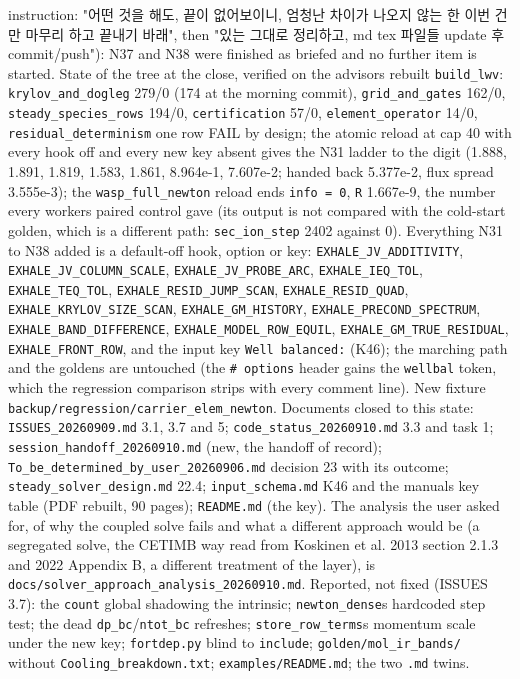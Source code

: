 \documentclass[english,a4paper]{my_memo}
\begin{document}
\begin{itemize}
  instruction: "어떤 것을 해도, 끝이 없어보이니, 엄청난 차이가 나오지 않는 한
  이번 건만 마무리 하고 끝내기 바래", then "있는 그대로 정리하고, md tex
  파일들 update 후 commit/push"): N37 and N38 were finished as briefed and
  no further item is started. State of the tree at the close, verified on
  the advisor\textquotesingle s rebuilt \texttt{build\_lwv}: \texttt{krylov\_and\_dogleg} 279/0 (174 at the
  morning commit), \texttt{grid\_and\_gates} 162/0, \texttt{steady\_species\_rows} 194/0,
  \texttt{certification} 57/0, \texttt{element\_operator} 14/0, \texttt{residual\_determinism} one
  row FAIL by design; the atomic reload at cap 40 with every hook off and
  every new key absent gives the N31 ladder to the digit (1.888, 1.891,
  1.819, 1.583, 1.861, 8.964e-1, 7.607e-2; handed back 5.377e-2, flux
  spread 3.555e-3); the \texttt{wasp\_full\_newton} reload ends \texttt{info\ =\ 0}, \texttt{\textbar{}\textbar{}R\textbar{}\textbar{}}
  1.667e-9, the number every worker\textquotesingle s paired control gave (its output is
  not compared with the cold-start golden, which is a different path:
  \texttt{sec\_ion\_step} 2402 against 0). Everything N31 to N38 added is a
  default-off hook, option or key: \texttt{EXHALE\_JV\_ADDITIVITY},
  \texttt{EXHALE\_JV\_COLUMN\_SCALE}, \texttt{EXHALE\_JV\_PROBE\_ARC}, \texttt{EXHALE\_IEQ\_TOL},
  \texttt{EXHALE\_TEQ\_TOL}, \texttt{EXHALE\_RESID\_JUMP\_SCAN}, \texttt{EXHALE\_RESID\_QUAD},
  \texttt{EXHALE\_KRYLOV\_SIZE\_SCAN}, \texttt{EXHALE\_GM\_HISTORY}, \texttt{EXHALE\_PRECOND\_SPECTRUM},
  \texttt{EXHALE\_BAND\_DIFFERENCE}, \texttt{EXHALE\_MODEL\_ROW\_EQUIL},
  \texttt{EXHALE\_GM\_TRUE\_RESIDUAL}, \texttt{EXHALE\_FRONT\_ROW}, and the input key
  \texttt{Well\ balanced:} (K46); the marching path and the goldens are untouched
  (the \texttt{\#\ options} header gains the \texttt{wellbal} token, which the regression
  comparison strips with every comment line). New fixture
  \texttt{backup/regression/carrier\_elem\_newton}. Documents closed to this state:
  \texttt{ISSUES\_20260909.md} 3.1, 3.7 and 5; \texttt{code\_status\_20260910.md} 3.3 and
  task 1; \texttt{session\_handoff\_20260910.md} (new, the handoff of record);
  \texttt{To\_be\_determined\_by\_user\_20260906.md} decision 23 with its outcome;
  \texttt{steady\_solver\_design.md} 22.4; \texttt{input\_schema.md} K46 and the manual\textquotesingle s
  key table (PDF rebuilt, 90 pages); \texttt{README.md} (the key). The analysis
  the user asked for, of why the coupled solve fails and what a different
  approach would be (a segregated solve, the CETIMB way read from
  Koskinen et al. 2013 section 2.1.3 and 2022 Appendix B, a different
  treatment of the layer), is \texttt{docs/solver\_approach\_analysis\_20260910.md}.
  Reported, not fixed (ISSUES 3.7): the \texttt{count} global shadowing the
  intrinsic; \texttt{newton\_dense}\textquotesingle s hardcoded step test; the dead \texttt{dp\_bc}/\texttt{ntot\_bc}
  refreshes; \texttt{store\_row\_terms}\textquotesingle s momentum scale under the new key;
  \texttt{fortdep.py} blind to \texttt{include}; \texttt{golden/mol\_ir\_bands/} without
  \texttt{Cooling\_breakdown.txt}; \texttt{examples/README.md}; the two \texttt{.md} twins.
\end{itemize}
\end{document}

